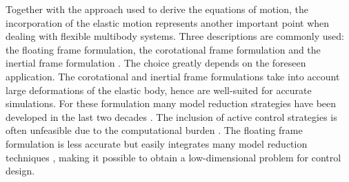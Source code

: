 \documentclass{svjour3}                     %
\newcommand{\firstRev}[1]{\textcolor{red!80!black}{#1}}
\begin{document}
\indent Together with the approach used to derive the equations of motion, the incorporation of the elastic motion represents another important point when dealing with flexible multibody systems. Three descriptions are commonly used: the floating frame formulation, the corotational frame formulation and the inertial frame formulation \cite{Ellenbroek2018}. The choice greatly depends on the foreseen application.  The corotational and inertial frame formulations take into account large deformations of the elastic body, hence are well-suited for accurate simulations. \firstRev{For these formulation many model reduction strategies have been developed in the last two decades \cite{rong2019}.} The inclusion of active control strategies is often unfeasible due to the computational burden \cite{Noor_rev}. The floating frame formulation is less accurate but easily integrates many model reduction techniques \cite{NOWAKOWSKI201240}, making it possible to obtain a low-dimensional problem for control design. \\
\end{document}
